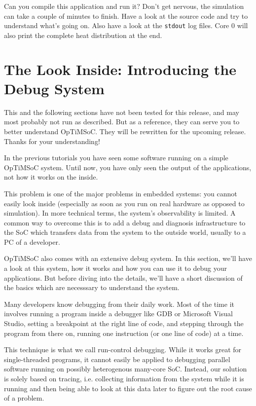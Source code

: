 Can you compile this application and run it? Don't get nervous, the simulation
can take a couple of minutes to finish. Have a look at the source code and try
to understand what's going on. Also have a look at the \verb|stdout| log files.
Core 0 will also print the complete heat distribution at the end.

\section{The Look Inside: Introducing the Debug System}

\begin{docnote}
This and the following sections have not been tested for this release,
and may most probably not run as described. But as a reference, they
can serve you to better understand OpTiMSoC. They will be rewritten
for the upcoming release. Thanks for your understanding!
\end{docnote}

In the previous tutorials you have seen some software running on a simple
OpTiMSoC system. Until now, you have only seen the output of the applications,
not how it works on the inside.

This problem is one of the major problems in embedded systems: you cannot
easily look inside (especially as soon as you run on real hardware as opposed
to simulation). In more technical terms, the system's observability is
limited. A common way to overcome this is to add a debug and diagnosis
infrastructure to the SoC which transfers data from the system to the outside
world, usually to a PC of a developer.

OpTiMSoC also comes with an extensive debug system. In this section, we'll have
a look at this system, how it works and how you can use it to debug your
applications. But before diving into the details, we'll have a short discussion
of the basics which are necesssary to understand the system.

Many developers know debugging from their daily work. Most of the time it
involves running a program inside a debugger like GDB or Microsoft Visual
Studio, setting a breakpoint at the right line of code, and stepping through the
program from there on, running one instruction (or one line of code) at a time.

This technique is what we call run-control debugging. While it works great for
single-threaded programs, it cannot easily be applied to debugging parallel
software running on possibly heterogenous many-core SoC. Instead, our solution
is solely based on tracing, i.e. collecting information from the system while
it is running and then being able to look at this data later to figure out the
root cause of a problem.

